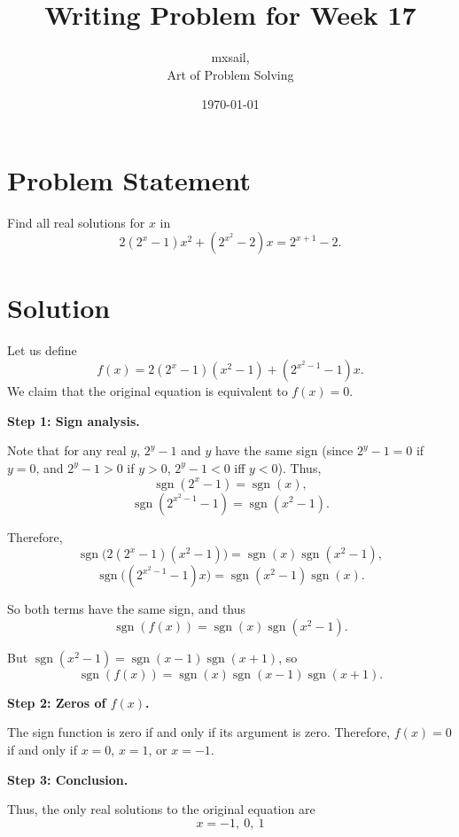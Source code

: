 \documentclass{article}
\title{Writing Problem for Week 17}
\author{mxsail, \\ Art of Problem Solving}
\date{\today}
\begin{document}
\maketitle

\section*{Problem Statement}
Find all real solutions for $x$ in
\[ 2(2^x- 1) x^2 + (2^{x^2}-2)x = 2^{x+1} -2 . \]

\section*{Solution}

Let us define
\[
f(x) = 2(2^x-1)(x^2-1) + (2^{x^2-1}-1)x.
\]
We claim that the original equation is equivalent to $f(x) = 0$.

\textbf{Step 1: Sign analysis.}

Note that for any real $y$, $2^y-1$ and $y$ have the same sign (since $2^y-1 = 0$ if $y=0$, and $2^y-1 > 0$ if $y > 0$, $2^y-1 < 0$ iff $y < 0$). Thus,
\[
\operatorname{sgn}(2^x-1) = \operatorname{sgn}(x),
\]
\[
\operatorname{sgn}(2^{x^2-1}-1) = \operatorname{sgn}(x^2-1).
\]

Therefore,
\[
\operatorname{sgn}\big(2(2^x-1)(x^2-1)\big) = \operatorname{sgn}(x)\operatorname{sgn}(x^2-1),
\]
\[
\operatorname{sgn}\big((2^{x^2-1}-1)x\big) = \operatorname{sgn}(x^2-1)\operatorname{sgn}(x).
\]

So both terms have the same sign, and thus
\[
\operatorname{sgn}(f(x)) = \operatorname{sgn}(x)\operatorname{sgn}(x^2-1).
\]

But $\operatorname{sgn}(x^2-1) = \operatorname{sgn}(x-1)\operatorname{sgn}(x+1)$, so
\[
\operatorname{sgn}(f(x)) = \operatorname{sgn}(x)\operatorname{sgn}(x-1)\operatorname{sgn}(x+1).
\]

\textbf{Step 2: Zeros of $f(x)$.}

The sign function is zero if and only if its argument is zero. Therefore, $f(x) = 0$ if and only if $x = 0$, $x = 1$, or $x = -1$.

\textbf{Step 3: Conclusion.}

Thus, the only real solutions to the original equation are
\[
\boxed{x = -1,\ 0,\ 1}
\]
\end{document}

